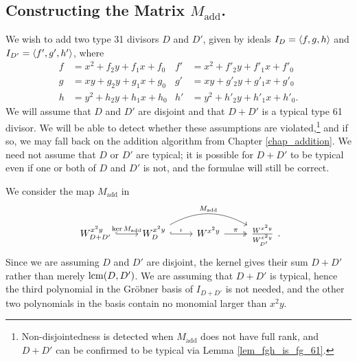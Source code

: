 
\subsection{Constructing the Matrix $M_{\text{add}}$.}

We wish to add two type 31 divisors $D$ and $D'$,
given by ideals $I_D = \left\langle f,g,h \right\rangle$ and $I_{D'} = \left\langle f',g',h' \right\rangle$, where
\begin{align*}
  f &= x^2 + f_2y + f_1x + f_0 & f' &= x^2 + f'_2y + f'_1x + f'_0 \\
  g &=  xy + g_2y + g_1x + g_0 & g' &=  xy + g'_2y + g'_1x + g'_0 \\
  h &= y^2 + h_2y + h_1x + h_0 & h' &= y^2 + h'_2y + h'_1x + h'_0.
\end{align*}
We will assume that $D$ and $D'$ are disjoint and that $D + D'$ is a typical type 61 divisor.
We will be able to detect whether these assumptions are violated,\footnote{
Non-disjointedness is detected when $M_{\text{add}}$ does not have full rank,
and $D+D'$ can be confirmed to be typical via Lemma \ref{lem_fgh_is_fg_61}.}
and if so, we may fall back on the addition algorithm from Chapter \ref{chap_addition}.
We need not assume that $D$ or $D'$ are typical;
it is possible for $D + D'$ to be typical even if one or both of $D$ and $D'$ is not,
and the formulae will still be correct.

We consider the map $M_{\text{add}}$ in 
\[  \begin{tikzcd}
      W_{D+D'}^{x^2y} \arrow[hook]{r}{\ker M_{\text{add}}} & 
      W_D^{x^2y} \arrow[hook]{r}{\iota} \arrow[bend left]{rr}{M_{\text{add}}} & 
      W^{x^2y} \arrow[two heads]{r}{\pi} & 
      \frac {W^{x^2y}} {W_{D'}^{x^2y}}
    \end{tikzcd}. \]
Since we are assuming $D$ and $D'$ are disjoint, the kernel gives their sum $D + D'$ rather than merely $\operatorname{lcm}(D,D')$.
We are assuming that $D + D'$ is typical, hence the third polynomial in the Gr\"obner basis of $I_{D+D'}$ is not needed,
and the other two polynomials in the basis contain no monomial larger than $x^2y$.

